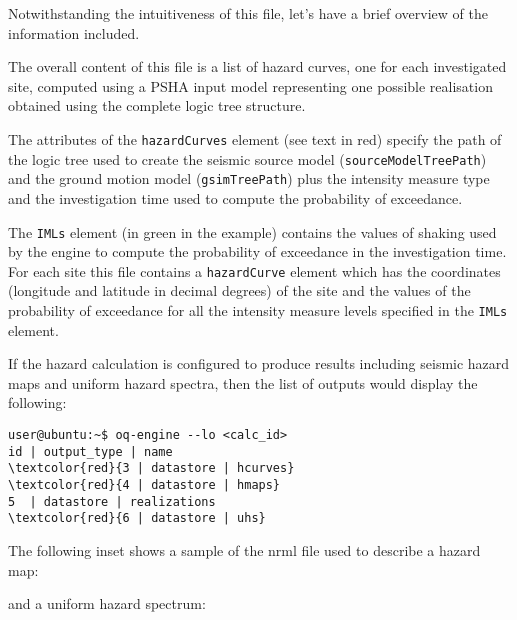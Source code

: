 

Notwithstanding the intuitiveness of this file, let's have a brief
overview of the information included.

The overall content of this file is a list of hazard curves, one for each
investigated site, computed using a PSHA input model representing one possible
realisation obtained using the complete logic tree structure.

The attributes of the \texttt{hazardCurves} element (see text in red) specify
the path of the logic tree used to create the seismic source model
(\texttt{source\-Model\-TreePath}) and the ground motion model
(\texttt{gsim\-Tree\-Path}) plus the intensity measure type and the
investigation time used to compute the probability of exceedance.

The \texttt{IMLs} element (in green in the example) contains the values of
shaking used by the engine to compute the probability of exceedance in the
investigation time. For each site this file contains a \texttt{hazardCurve}
element which has the coordinates (longitude and latitude in decimal degrees)
of the site and the values of the probability of exceedance for all the
intensity measure levels specified in the \texttt{IMLs} element.

If the hazard calculation is configured to produce results including seismic hazard maps and uniform hazard spectra, then the list of outputs would display the following:

\begin{Verbatim}[frame=single, commandchars=\\\{\}, fontsize=\small]
user@ubuntu:~$ oq-engine --lo <calc_id>
id | output_type | name
\textcolor{red}{3 | datastore | hcurves}
\textcolor{red}{4 | datastore | hmaps}
5  | datastore | realizations
\textcolor{red}{6 | datastore | uhs}
\end{Verbatim}

%


The following inset shows a sample of the nrml file used to describe a hazard map:



\noindent and a uniform hazard spectrum:

